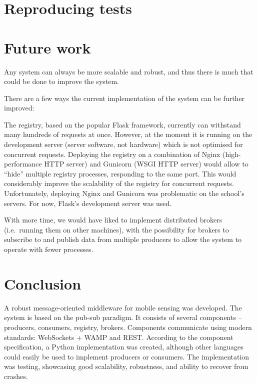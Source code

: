 \section{Reproducing tests}\label{reproducing-tests}

\section{Future work}\label{future-work}

Any system can always be more scalable and robust, and thus there is
much that could be done to improve the system.

There are a few ways the current implementation of the system can be
further improved:

The registry, based on the popular Flask framework, currently can
withstand many hundreds of requests at once. However, at the moment it
is running on the development server (server software, not hardware)
which is not optimised for concurrent requests. Deploying the registry
on a combination of Nginx (high-performance HTTP server) and Gunicorn
(WSGI HTTP server) would allow to ``hide'' multiple registry processes,
responding to the same port. This would considerably improve the
scalability of the registry for concurrent requests. Unfortunately,
deploying Nginx and Gunicorn was problematic on the school's servers.
For now, Flask's development server was used.

With more time, we would have liked to implement distributed brokers
(i.e.~running them on other machines), with the possibility for brokers
to subscribe to and publish data from multiple producers to allow the
system to operate with fewer processes.

\section{Conclusion}\label{conclusion}

A robust message-oriented middleware for mobile sensing was developed.
The system is based on the pub-sub paradigm. It consists of several
components -- producers, consumers, registry, brokers. Components
communicate using modern standards: WebSockets + WAMP and REST.
According to the component specification, a Python implementation was
created, although other languages could easily be used to implement
producers or consumers. The implementation was testing, showcasing good
scalability, robustness, and ability to recover from crashes.
